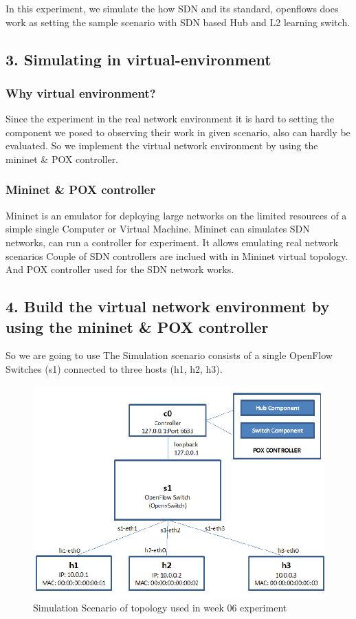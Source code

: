 In this experiment, we simulate the how SDN and its standard, openflows does work as setting the sample scenario with SDN based Hub and L2 learning switch. 

\subsection*{3. Simulating in virtual-environment}
\subsubsection*{Why virtual environment?}
Since the experiment in the real network environment it is hard to setting the component we posed to observing their work in given scenario, also can hardly be evaluated. So we implement the virtual network environment by using the mininet \& POX controller.  
\subsubsection*{Mininet \& POX controller}
Mininet is an emulator for deploying large networks on the limited resources of a simple single Computer or Virtual Machine. 
Mininet can simulates SDN networks, can run a controller for experiment. It allows emulating real network scenarios Couple of SDN controllers are inclued with in Mininet virtual topology. And POX controller used for the SDN network works.
\subsection*{4. Build the virtual network environment by  using the mininet \& POX controller}
So we are going to use
The Simulation scenario consists of a single OpenFlow Switches (s1) connected to three hosts (h1, h2, h3).\\
\vspace{-4mm}
\begin{figure}[!h]\centering 
	\includegraphics[width=.55\textwidth]{image/week06/0-1.png}
	\caption{\footnotesize 
	Simulation Scenario of topology used in week 06 experiment}
	\vspace{-10pt}
\end{figure}

